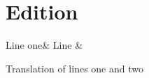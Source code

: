 \documentclass{memoir}
\begin{document}
\mainmatter
\chapter{Edition}

\begin{pairs}
\begin{Leftside}
\beginnumbering
\begin{astanza}
Line one&
Line \&
\end{astanza}
\endnumbering
\end{Leftside}

\begin{Rightside}
\beginnumbering
\autopar
\noindent Translation of lines one and two\pend
\endnumbering
\end{Rightside}
\end{pairs}

\Columns

\end{document}
